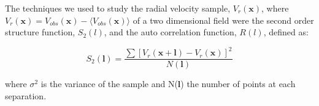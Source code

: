 The techniques we used to study the radial velocity sample, $V_{r}(\boldsymbol{x})$, where $V_{r}(\boldsymbol{x})= V_{obs}(\boldsymbol{x})-\langle V_{obs}(\boldsymbol{x}) \rangle$ of a two dimensional field were the second order structure function, $S_{2}(l)$, and the auto correlation function, $R(l)$, defined as: 

\begin{equation}\label{eq:S}
S_{2}(\boldsymbol{l})=\dfrac{\sum[V_{r}(\boldsymbol{x}+\boldsymbol{l})-V_{r}(\boldsymbol{x}) ]^{2}}{N(\boldsymbol{l})}
\end{equation}

where $\sigma^{2}$ is the variance of the sample and N($\boldsymbol{l}$) the number of points at each separation.




